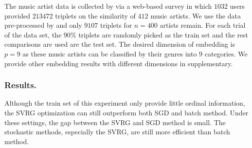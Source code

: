 \documentclass[letterpaper]{article}
\newcommand{\qqxu}[1]{\textcolor[rgb]{0.00,1.00,0.00}{#1}}
\begin{document}
		The music artist data is collected by \cite{ellis2002quest} via a web-based survey in which $1032$ users provided $213472$ triplets on the similarity of $412$ music artists. We use the data pre-processed by \cite{vandermaaten2012stochastic} and only $9107$ triplets for $n=400$ artists remain. For each trial of the data set, the $90\%$ triplets are randomly picked as the train set and the rest comparisons are used are the test set. The desired dimension of embedding is $p = 9$ as these music artists can be classified by their genres into $9$ categories. We provide other embedding results with different dimensions in supplementary.

		\subsubsection{Results.}
		
		Although the train set of this experiment only provide little ordinal information, the SVRG optimization can still outperform both SGD and batch method. Under these settings, the gap between the SVRG and SGD method is small. The stochastic methods, especially the SVRG, are still more efficient than batch method.


		
\end{document}
